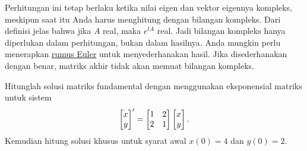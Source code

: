Perhitungan ini tetap berlaku ketika nilai eigen dan
vektor eigennya kompleks, meskipun saat itu Anda harus menghitung dengan bilangan
kompleks.  Dari definisi jelas bahwa jika $A$ real,
maka $e^{tA}$ real.  Jadi bilangan kompleks hanya diperlukan dalam
perhitungan, bukan dalam hasilnya.  Anda mungkin perlu menerapkan
\hyperref[eulersformula]{rumus Euler} untuk menyederhanakan
hasil.  Jika disederhanakan dengan benar, matriks akhir tidak akan memuat bilangan
kompleks.

\begin{example}
Hitunglah solusi matriks fundamental dengan menggunakan eksponensial matriks
untuk sistem
\begin{equation*}
\begin{bmatrix}
x \\ y
\end{bmatrix} '
=
\begin{bmatrix}
1 & 2 \\
2 & 1
\end{bmatrix}
\begin{bmatrix}
x \\ y
\end{bmatrix} .
\avoidbreak
\end{equation*}
Kemudian hitung solusi khusus untuk syarat awal
$x(0) = 4$ dan $y(0) = 2$.


\end{example}
